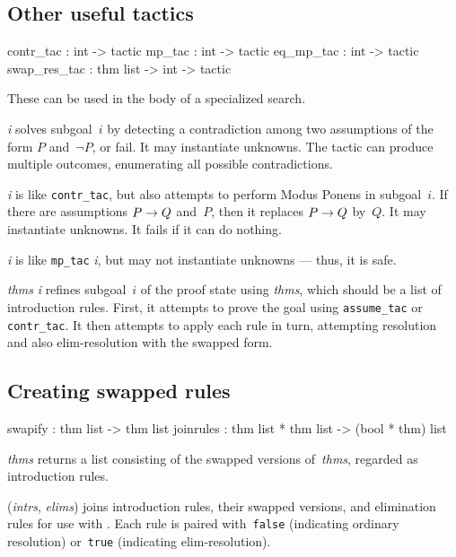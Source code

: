\subsection{Other useful tactics}
\begin{ttbox} 
contr_tac    :             int -> tactic
mp_tac       :             int -> tactic
eq_mp_tac    :             int -> tactic
swap_res_tac : thm list -> int -> tactic
\end{ttbox}
These can be used in the body of a specialized search.
\begin{ttdescription}
\item[\ttindexbold{contr_tac} {\it i}]
  solves subgoal~$i$ by detecting a contradiction among two assumptions of
  the form $P$ and~$\neg P$, or fail.  It may instantiate unknowns.  The
  tactic can produce multiple outcomes, enumerating all possible
  contradictions.

\item[\ttindexbold{mp_tac} {\it i}] 
is like {\tt contr_tac}, but also attempts to perform Modus Ponens in
subgoal~$i$.  If there are assumptions $P\rightarrow Q$ and~$P$, then it replaces
$P\rightarrow Q$ by~$Q$.  It may instantiate unknowns.  It fails if it can do
nothing.

\item[\ttindexbold{eq_mp_tac} {\it i}] 
is like {\tt mp_tac} {\it i}, but may not instantiate unknowns --- thus, it
is safe.

\item[\ttindexbold{swap_res_tac} {\it thms} {\it i}] refines subgoal~$i$ of
the proof state using {\it thms}, which should be a list of introduction
rules.  First, it attempts to prove the goal using {\tt assume_tac} or
{\tt contr_tac}.  It then attempts to apply each rule in turn, attempting
resolution and also elim-resolution with the swapped form.
\end{ttdescription}

\subsection{Creating swapped rules}
\begin{ttbox} 
swapify   : thm list -> thm list
joinrules : thm list * thm list -> (bool * thm) list
\end{ttbox}
\begin{ttdescription}
\item[\ttindexbold{swapify} {\it thms}] returns a list consisting of the
swapped versions of~{\it thms}, regarded as introduction rules.

\item[\ttindexbold{joinrules} ({\it intrs}, {\it elims})]
joins introduction rules, their swapped versions, and elimination rules for
use with .  Each rule is paired with~{\tt false}
(indicating ordinary resolution) or~{\tt true} (indicating
elim-resolution).
\end{ttdescription}


